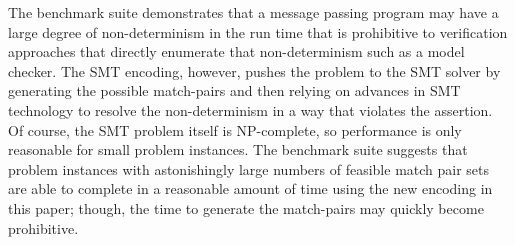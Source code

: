 The benchmark suite demonstrates that a message passing program may have a large degree of non-determinism in the run time that is prohibitive to verification approaches that directly enumerate that non-determinism such as a model checker. The SMT encoding, however, pushes the problem to the SMT solver by generating the possible match-pairs and then relying on advances in SMT technology to resolve the non-determinism in a way that violates the assertion. Of course, the SMT problem itself is NP-complete, so performance is only reasonable for small problem instances. The benchmark suite suggests that problem instances with astonishingly large numbers of feasible match pair sets are able to complete in a reasonable amount of time using the new encoding in this paper; though, the time to generate the match-pairs may quickly become prohibitive.

